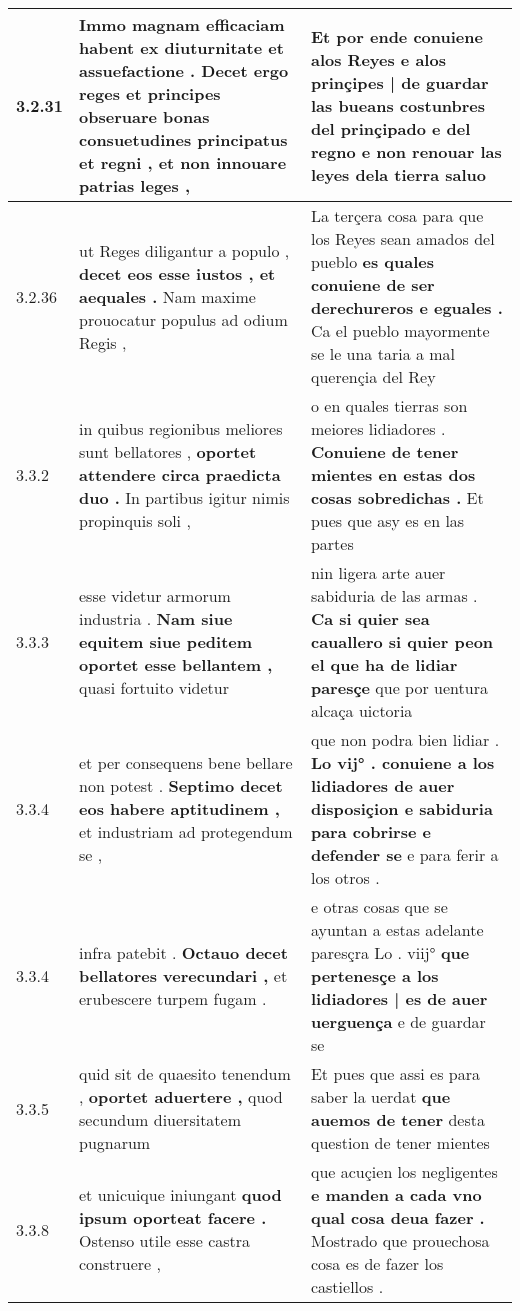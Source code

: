 \begin{tabular}{|p{1cm}|p{6.5cm}|p{6.5cm}|}
3.2.31 & Immo magnam efficaciam habent ex diuturnitate et assuefactione . \textbf{ Decet ergo reges et principes obseruare bonas consuetudines principatus et regni , } et non innouare patrias leges , & Et por ende conuiene alos Reyes \textbf{ e alos prinçipes | de guardar las bueans costunbres del prinçipado e del regno } e non renouar las leyes dela tierra saluo \\\hline
3.2.36 & ut Reges diligantur a populo , \textbf{ decet eos esse iustos , et aequales . } Nam maxime prouocatur populus ad odium Regis , & La terçera cosa para que los Reyes sean amados del pueblo \textbf{ es quales conuiene de ser derechureros e eguales . } Ca el pueblo mayormente se le una taria a mal querençia del Rey \\\hline
3.3.2 & in quibus regionibus meliores sunt bellatores , \textbf{ oportet attendere circa praedicta duo . } In partibus igitur nimis propinquis soli , & o en quales tierras son meiores lidiadores . \textbf{ Conuiene de tener mientes en estas dos cosas sobredichas . } Et pues que asy es en las partes \\\hline
3.3.3 & esse videtur armorum industria . \textbf{ Nam siue equitem siue peditem oportet esse bellantem , } quasi fortuito videtur & nin ligera arte auer sabiduria de las armas . \textbf{ Ca si quier sea cauallero si quier peon el que ha de lidiar paresçe } que por uentura alcaça uictoria \\\hline
3.3.4 & et per consequens bene bellare non potest . \textbf{ Septimo decet eos habere aptitudinem , } et industriam ad protegendum se , & que non podra bien lidiar . \textbf{ Lo vij° . conuiene a los lidiadores de auer disposiçion e sabiduria para cobrirse e defender se } e para ferir a los otros . \\\hline
3.3.4 & infra patebit . \textbf{ Octauo decet bellatores verecundari , } et erubescere turpem fugam . & e otras cosas que se ayuntan a estas adelante paresçra Lo . viij° \textbf{ que pertenesçe a los lidiadores | es de auer uerguença } e de guardar se \\\hline
3.3.5 & quid sit de quaesito tenendum , \textbf{ oportet aduertere , } quod secundum diuersitatem pugnarum & Et pues que assi es para saber la uerdat \textbf{ que auemos de tener } desta question de tener mientes \\\hline
3.3.8 & et unicuique iniungant \textbf{ quod ipsum oporteat facere . } Ostenso utile esse castra construere , & que acuçien los negligentes \textbf{ e manden a cada vno qual cosa deua fazer . } Mostrado que prouechosa cosa es de fazer los castiellos . \\\hline

\end{tabular}
